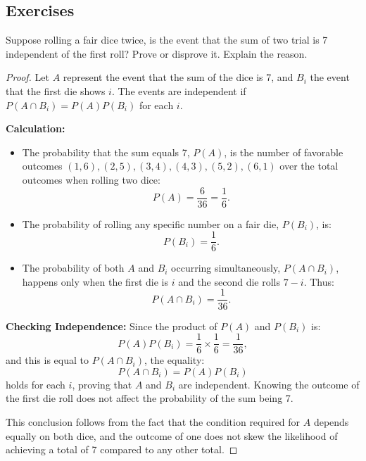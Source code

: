 \subsection{Exercises}
\begin{exercise}
    Suppose rolling a fair dice twice, is the event that the sum of two trial is 7 independent of the first
    roll? Prove or disprove it. Explain the reason.
\end{exercise}
\begin{proof}
    Let \(A\) represent the event that the sum of the dice is 7, and \(B_i\) the event that the first die shows \(i\). The events are independent if \(P(A \cap B_i) = P(A)P(B_i)\) for each \(i\).
    
    \textbf{Calculation:}
    \begin{itemize}
        \item The probability that the sum equals 7, \(P(A)\), is the number of favorable outcomes \((1,6), (2,5), (3,4), (4,3), (5,2), (6,1)\) over the total outcomes when rolling two dice:
        \[
        P(A) = \frac{6}{36} = \frac{1}{6}.
        \]
        \item The probability of rolling any specific number on a fair die, \(P(B_i)\), is:
        \[
        P(B_i) = \frac{1}{6}.
        \]
        \item The probability of both \(A\) and \(B_i\) occurring simultaneously, \(P(A \cap B_i)\), happens only when the first die is \(i\) and the second die rolls \(7-i\). Thus:
        \[
        P(A \cap B_i) = \frac{1}{36}.
        \]
    \end{itemize}
    
    \textbf{Checking Independence:}
    Since the product of \(P(A)\) and \(P(B_i)\) is:
    \[
    P(A)P(B_i) = \frac{1}{6} \times \frac{1}{6} = \frac{1}{36},
    \]
    and this is equal to \(P(A \cap B_i)\), the equality:
    \[
    P(A \cap B_i) = P(A)P(B_i)
    \]
    holds for each \(i\), proving that \(A\) and \(B_i\) are independent. Knowing the outcome of the first die roll does not affect the probability of the sum being 7.
    
    This conclusion follows from the fact that the condition required for \(A\) depends equally on both dice, and the outcome of one does not skew the likelihood of achieving a total of 7 compared to any other total.
    \end{proof}
    
